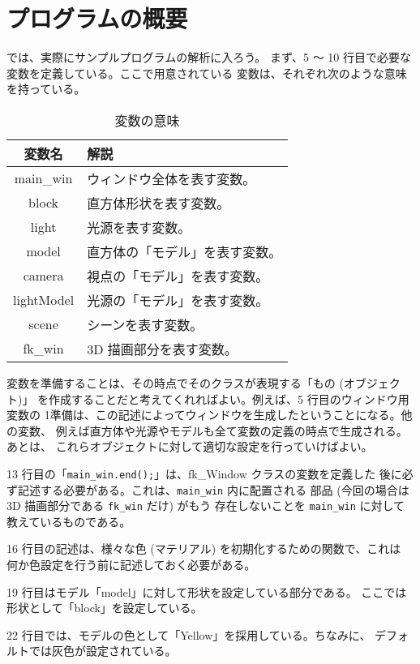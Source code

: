 \section{プログラムの概要}
では、実際にサンプルプログラムの解析に入ろう。
まず、5 〜 10 行目で必要な変数を定義している。ここで用意されている
変数は、それぞれ次のような意味を持っている。
\begin{table}[H]
\caption{変数の意味}
\label{tbl:samp1}
\begin{center}
\begin{tabular}{|c|l|}
\hline
変数名 & 解説 \\ \hline \hline
main\_win & ウィンドウ全体を表す変数。\\ \hline
block & 直方体形状を表す変数。\\ \hline
light & 光源を表す変数。\\ \hline
model & 直方体の「モデル」を表す変数。\\ \hline
camera & 視点の「モデル」を表す変数。\\ \hline
lightModel & 光源の「モデル」を表す変数。\\ \hline
scene & シーンを表す変数。\\ \hline
fk\_win & 3D 描画部分を表す変数。\\ \hline
\end{tabular}
\end{center}
\end{table}

変数を準備することは、その時点でそのクラスが表現する「もの (オブジェクト)」
を作成することだと考えてくれればよい。例えば、5 行目のウィンドウ用変数の
1準備は、この記述によってウィンドウを生成したということになる。他の変数、
例えば直方体や光源やモデルも全て変数の定義の時点で生成される。あとは、
これらオブジェクトに対して適切な設定を行っていけばよい。

13 行目の「\verb+main_win.end();+」は、fk\_Window クラスの変数を定義した
後に必ず記述する必要がある。これは、\verb+main_win+ 内に配置される
部品 (今回の場合は 3D 描画部分である \verb+fk_win+ だけ) がもう
存在しないことを \verb+main_win+ に対して教えているものである。

16 行目の記述は、様々な色 (マテリアル) を初期化するための関数で、これは
何か色設定を行う前に記述しておく必要がある。

19 行目はモデル「model」に対して形状を設定している部分である。
ここでは形状として「block」を設定している。

22 行目では、モデルの色として「Yellow」を採用している。ちなみに、
デフォルトでは灰色が設定されている。

